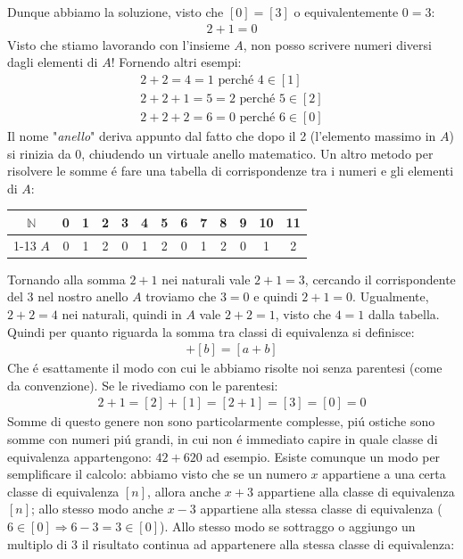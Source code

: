 \documentclass[twoside]{article} %
\begin{document}
	Dunque abbiamo la soluzione, visto che $[0]=[3]$ o equivalentemente $0=3$:
	 \begin{gather*}
	 	2+1=0
	 \end{gather*}
	 \newpage
	 \noindent Visto che stiamo lavorando con l'insieme $A$, non posso scrivere numeri diversi dagli elementi di $A$! Fornendo altri esempi:
	 \begin{gather*}
	 	2+2=4=1 \text{ perch\'e }4\in[1]\\
	 	2+2+1=5=2\text{ perch\'e }5\in[2]\\
	 	2+2+2=6=0 \text{ perch\'e }6\in[0]
	 \end{gather*} 
	  Il nome "\textit{anello}" deriva appunto dal fatto che dopo il 2 (l'elemento massimo in $A$) si rinizia da $0$, chiudendo un virtuale anello matematico. Un altro metodo per risolvere le somme \'e fare una tabella di corrispondenze tra i numeri e gli elementi di $A$:
	 \begin{center}
	 	\begin{tabular}{c|c|c|c|c|c|c|c|c|c|c|c|c}
	 		$\mathbb{N}$&0&1&2&3&4&5&6&7&8&9&10&11\\\cline{1-13}
	 		$A$&0&1&2&0&1&2&0&1&2&0&1&2
	 	\end{tabular}
	 \end{center}
	 Tornando alla somma $2+1$ nei naturali vale $2+1=3$, cercando il corrispondente del $3$ nel nostro anello $A$ troviamo che $3=0$ e quindi $2+1=0$. Ugualmente, $2+2=4$ nei naturali, quindi in $A$ vale $2+2=1$, visto che $4=1$ dalla tabella.\\
	 Quindi per quanto riguarda la somma tra classi di equivalenza si definisce:
	\begin{gather*}
		[a]+[b]=[a+b]
	\end{gather*}
	Che \'e esattamente il modo con cui le abbiamo risolte noi senza parentesi (come da convenzione). Se le rivediamo con le parentesi:
	\begin{gather*}
		2+1=[2]+[1]=[2+1]=[3]=[0]=0
	\end{gather*}
	 Somme di questo genere non sono particolarmente complesse, pi\'u ostiche sono somme con numeri pi\'u grandi, in cui non \'e immediato capire in quale classe di equivalenza appartengono: $42+620$ ad esempio. Esiste comunque un modo per semplificare il calcolo: abbiamo visto che se un numero $x$ appartiene a una certa classe di equivalenza $[n]$, allora anche $x+3$ appartiene alla classe di equivalenza $[n]$; allo stesso modo anche $x-3$ appartiene alla stessa classe di equivalenza ($6\in [0] \Rightarrow 6-3=3\in [0]$). Allo stesso modo se sottraggo o aggiungo un multiplo di $3$ il risultato continua ad appartenere alla stessa classe di equivalenza:
\end{document}

